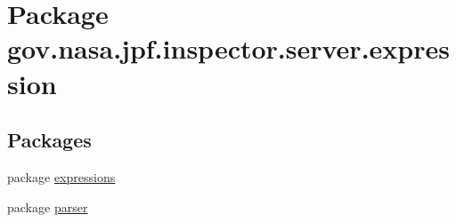 \hypertarget{namespacegov_1_1nasa_1_1jpf_1_1inspector_1_1server_1_1expression}{}\section{Package gov.\+nasa.\+jpf.\+inspector.\+server.\+expression}
\label{namespacegov_1_1nasa_1_1jpf_1_1inspector_1_1server_1_1expression}
\subsection*{Packages}
\begin{DoxyCompactItemize}
\item 
package \hyperlink{namespacegov_1_1nasa_1_1jpf_1_1inspector_1_1server_1_1expression_1_1expressions}{expressions}
\item 
package \hyperlink{namespacegov_1_1nasa_1_1jpf_1_1inspector_1_1server_1_1expression_1_1parser}{parser}
\end{DoxyCompactItemize}
